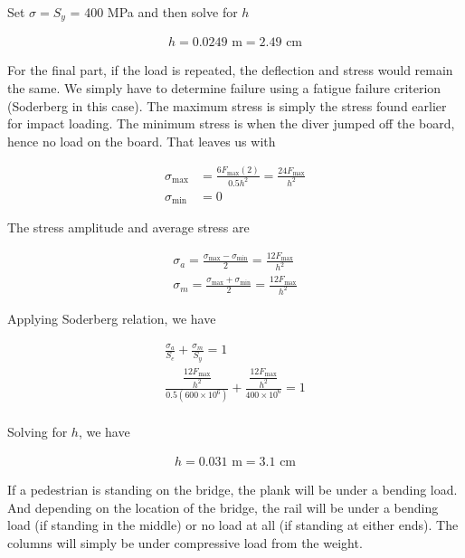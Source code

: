 \documentclass[
10pt,
a4paper,
openany,
svgnames,
]{book}
\begin{document}
\begin{evensolution}
  Set $\sigma = S_y$ = 400 MPa and then solve for $h$

  \begin{align*}
    h = 0.0249 \text{ m} = 2.49 \text{ cm}
  \end{align*}

  For the final part, if the load is repeated, the deflection and stress would
  remain the same. We simply have to determine failure using a fatigue failure
  criterion (Soderberg in this case). The maximum stress is simply the stress
  found earlier for impact loading. The minimum stress is when the diver jumped
  off the board, hence no load on the board. That leaves us with

  \begin{align*}
    \sigma_{\max} &= \frac{6F_{\max}(2)}{0.5h^2} = \frac{24F_{\max}}{h^2} \\
    \sigma_{\min} &= 0
  \end{align*}

  The stress amplitude and average stress are

  \begin{align*}
    \sigma_a = \frac{\sigma_{\max} - \sigma_{\min}}{2} = \frac{12F_{\max}}{h^2} \\
    \sigma_m = \frac{\sigma_{\max} + \sigma_{\min}}{2} = \frac{12F_{\max}}{h^2}
  \end{align*}

  Applying Soderberg relation, we have

  \begin{align*}
    \frac{\sigma_a}{S_e} + \frac{\sigma_m}{S_y} = 1 \\
    \frac{\dfrac{12F_{\max}}{h^2}}{0.5(600 \times 10^6)} + \frac{\dfrac{12F_{\max}}{h^2}}{400 \times 10^6} = 1 \\
  \end{align*}

  Solving for $h$, we have

  \begin{align*}
    h = 0.031 \text{ m} = 3.1 \text{ cm}
  \end{align*}

\item

  If a pedestrian is standing on the bridge, the plank will be under a bending
  load. And depending on the location of the bridge, the rail will be under a
  bending load (if standing in the middle) or no load at all (if standing at
  either ends). The columns will simply be under compressive load from the
  weight.


\end{evensolution}
\end{document}
